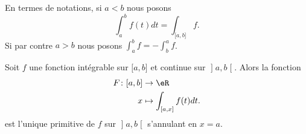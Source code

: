 En termes de notations, si \( a<b\) nous posons
\begin{equation}
    \int_a^bf(t)dt=\int_{\mathopen[ a , b \mathclose]}f.
\end{equation}
Si par contre \( a>b\) nous posons \( \int_a^bf=-\int_b^af\).

\begin{proposition} \label{PropEZFRsMj}
    Soit \( f\) une fonction intégrable sur \( \mathopen[ a , b \mathclose]\) et continue sur \( \mathopen] a , b \mathclose[\). Alors la fonction
    \begin{equation}
        \begin{aligned}
            F\colon \mathopen[ a , b \mathclose]&\to \eR \\
            x&\mapsto \int_{\mathopen[ a , x \mathclose]}f(t)dt.
        \end{aligned}
    \end{equation}
est l'unique primitive de \( f\) sur \( \mathopen] a , b \mathclose[\) s'annulant en \( x=a\).
\end{proposition}

